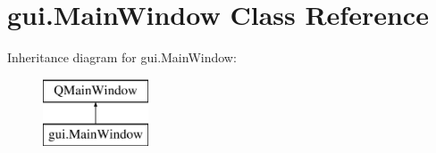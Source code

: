 \hypertarget{classgui_1_1_main_window}{}\section{gui.\+Main\+Window Class Reference}
\label{classgui_1_1_main_window}
Inheritance diagram for gui.\+Main\+Window\+:\begin{figure}[H]
\begin{center}
\leavevmode
\includegraphics[height=2.000000cm]{df/d15/classgui_1_1_main_window}
\end{center}
\end{figure}
